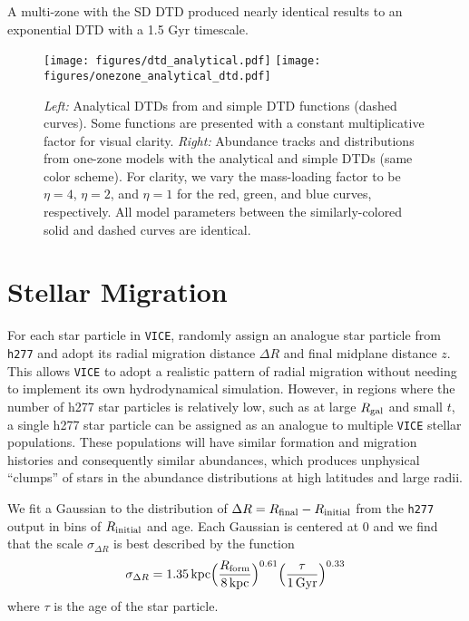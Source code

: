 \documentclass[twocolumn,twocolappendix,linenumbers,trackchanges]{aastex631}
\newcommand{\vice}{{\tt VICE}\xspace}
\begin{document}
A multi-zone with the \citet{Greggio2005-AnalyticalRates} SD DTD produced nearly identical results to an exponential DTD with a 1.5 Gyr timescale.

\begin{figure*}
    \centering
    \texttt{[image: figures/dtd\_analytical.pdf]}
    \texttt{[image: figures/onezone\_analytical\_dtd.pdf]}
    \caption{\textit{Left:} Analytical DTDs from \citet[][solid curves]{Greggio2005-AnalyticalRates} and simple DTD functions (dashed curves). Some functions are presented with a constant multiplicative factor for visual clarity. \textit{Right:} Abundance tracks and distributions from one-zone models with the analytical and simple DTDs (same color scheme). For clarity, we vary the mass-loading factor to be $\eta=4$, $\eta=2$, and $\eta=1$ for the red, green, and blue curves, respectively. All model parameters between the similarly-colored solid and dashed curves are identical.}
    \label{fig:analytical-dtd}
\end{figure*}

\section{Stellar Migration}
\label{app:migration}

For each star particle in \vice,  randomly assign an analogue star particle from \texttt{h277} and adopt its radial migration distance $\Delta R$ and final midplane distance $z$. This allows \vice to adopt a realistic pattern of radial migration without needing to implement its own hydrodynamical simulation. However, in regions where the number of h277 star particles is relatively low, such as at large $R_{\rm gal}$ and small $t$, a single h277 star particle can be assigned as an analogue to multiple \vice stellar populations. These populations will have similar formation and migration histories and consequently similar abundances, which produces unphysical ``clumps'' of stars in the abundance distributions at high latitudes and large radii. 

We fit a Gaussian to the distribution of $\Delta R = R_{\rm final} - R_{\rm initial}$ from the \texttt{h277} output in bins of $R_{\rm initial}$ and age. Each Gaussian is centered at 0 and we find that the scale $\sigma_{\Delta R}$ is best described by the function
\begin{equation}
    \sigma_{\Delta R} = 1.35\,{\rm kpc} \Big(\frac{R_{\rm form}}{8\,{\rm kpc}}\Big)^{0.61} \Big(\frac{\tau}{1\,{\rm Gyr}}\Big)^{0.33}
    \label{eq:radial-migration}
\end{equation}
where $\tau$ is the age of the star particle. 
\end{document}
